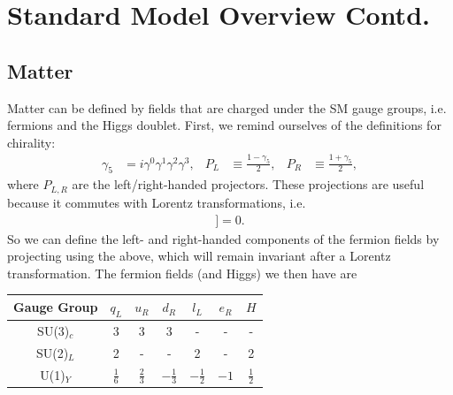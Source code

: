 \documentclass[relqm.tex]{subfiles}
\begin{document}
\chapter{Standard Model Overview Contd.}
\section{Matter}
Matter can be defined by fields that are charged under the SM gauge groups, i.e. fermions and the Higgs doublet. 
First, we remind ourselves of the definitions for chirality:
\begin{align}
    \gamma_5 &= i\gamma^0\gamma^1\gamma^2\gamma^3, & P_L &\equiv\frac{1-\gamma_5}{2}, & P_R &\equiv \frac{1+\gamma_5}{2},
\end{align}
where $P_{L,R}$ are the left/right-handed projectors. 
These projections are useful because it commutes with Lorentz transformations, i.e.
\begin{align}
    [\gamma_5,[\gamma_\mu,\gamma_\nu]] = 0.
\end{align}
So we can define the left- and right-handed components of the fermion fields by projecting using the above, which will remain invariant after a Lorentz transformation. 
The fermion fields (and Higgs) we then have are
\begin{table}[H]
    \centering
    \begin{tabular}{c|c|c|c|c|c|c}
        \hline\hline
        Gauge Group & $q_L$ & $u_R$ & $d_R$ & $l_L$ & $e_R$ & $H$ \\
        \hline\hline
        SU(3)$_c$ & 3 & 3 & 3 & - & - & - \\
        SU(2)$_L$ & 2 & - & - & 2 & - & 2 \\
        U(1)$_Y$  & $\frac16$ & $\frac23$ & $-\frac13$ & $-\frac12$ & $-1$ & $\frac12$\\
        \hline\hline
    \end{tabular}
\end{table}
\end{document}
